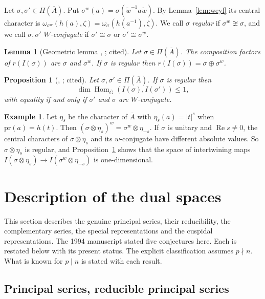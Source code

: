 \documentclass[12pt,letterpaper]{article}
\numberwithin{equation}{section}
\newtheorem{proposition}[theorem]{Proposition}
\newtheorem{lemma}[theorem]{Lemma}
\theoremstyle{definition}
\newtheorem{xexample}[theorem]{Example}
\newcommand{\cited}{cited}
\newcommand{\bG}{\overline{G}}
\newcommand{\bA}{\overline{A}}
\newcommand{\wt}{\tilde w}
\newcommand{\pr}{\mathrm{pr}}
\DeclareMathOperator{\Hom}{Hom}
\DeclareMathOperator{\re}{Re}
\begin{document}
Let $\sigma,\sigma'\in\Pi(\bA)$.  Put $\sigma^w(a)=\sigma(\wt^{-1}a\wt)$.  By
Lemma~\ref{lem:weyl} its central character is
$\omega_{\sigma^w}(h(a),\zeta)=\omega_\sigma(h(a^{-1}),\zeta)$.  We call $\sigma$
\emph{regular} if $\sigma^w\not\cong\sigma$, and we call $\sigma,\sigma'$
\emph{$W$-conjugate} if $\sigma'\cong\sigma$ or $\sigma'\cong\sigma^w$.

\begin{lemma}[Geometric lemma {\cite[Cor.~2.13]{BZ77}}, \cite{KS23}; \cited]\label{lem:geometric}
Let $\sigma\in\Pi(\bA)$.  The composition factors of $r(I(\sigma))$ are $\sigma$ and
$\sigma^w$.  If $\sigma$ is regular then $r(I(\sigma))=\sigma\oplus\sigma^w$.
\end{lemma}

\begin{proposition}[{\cite[Theorem~2.9]{BZ77}}, \cite{KS23}; \cited]\label{prop:hom}
Let $\sigma,\sigma'\in\Pi(\bA)$.  If $\sigma$ is regular then
\[
\dim\Hom_{\bG}(I(\sigma),I(\sigma'))\le1,
\]
with equality if and only if $\sigma'$ and $\sigma$ are $W$-conjugate.
\end{proposition}

\begin{xexample}\label{ex:regular}
Let $\eta_s$ be the character of $\bA$ with $\eta_s(a)=|t|^s$ when $\pr(a)=h(t)$.  Then
$(\sigma\otimes\eta_s)^w=\sigma^w\otimes\eta_{-s}$.  If $\sigma$ is unitary and
$\re s\ne0$, the central characters of $\sigma\otimes\eta_s$ and its $w$-conjugate have
different absolute values.  So $\sigma\otimes\eta_s$ is regular, and
Proposition~\ref{prop:hom} shows that the space of intertwining maps
$I(\sigma\otimes\eta_s)\to I(\sigma^w\otimes\eta_{-s})$ is one-dimensional.
\end{xexample}
\section{Description of the dual spaces}\label{sec:dual}

This section describes the genuine principal series, their reducibility, the complementary
series, the special representations and the cuspidal representations.  The 1994 manuscript
stated five conjectures here.  Each is restated below with its present status.  The
explicit classification assumes $p\nmid n$.  What is known for $p\mid n$ is stated with
each result.

\subsection{Principal series, reducible principal series}\label{subsec:ps}
\end{document}
